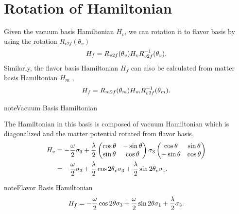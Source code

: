 \documentclass[letterpaper,12pt,english]{sphinxmanual}
\begin{document}
\section{Rotation of Hamiltonian}
\label{basis:rotation-of-hamiltonian}
Given the vacuum basis Hamiltonian \(H_v\), we can rotation it to flavor basis by using the rotation \(R_{v2f}(\theta_v)\)
\begin{gather}
\begin{split}H_f = R_{v2f}(\theta_v) H_v R_{v2f}^{-1}(\theta_v).\end{split}\notag
\end{gather}
Similarly, the flavor basis Hamiltonian \(H_f\) can also be calculated from matter basis Hamiltonian \(H_m\) ,
\begin{gather}
\begin{split}H_f = R_{m2f}(\theta_m) H_m R_{v2f}^{-1}(\theta_m).\end{split}\notag
\end{gather}
\begin{notice}{note}{Vacuum Basis Hamiltonian}

The Hamiltonian in this basis is composed of vacuum Hamiltonian which is diagonalized and the matter potential rotated from flavor basis,
\begin{gather}
\begin{split}H_v &= -\frac{\omega}{2} \sigma_3 + \frac{\lambda}{2} \begin{pmatrix} \cos \theta & -\sin \theta \\ \sin \theta & \cos\theta \end{pmatrix}  \sigma_3 \begin{pmatrix} \cos \theta & \sin \theta \\ -\sin \theta & \cos\theta \end{pmatrix} \\
&= -\frac{\omega}{2} \sigma_3 + \frac{\lambda}{2}\cos 2\theta_v \sigma_3 + \frac{\lambda}{2} \sin 2\theta_v \sigma_1.\end{split}\notag
\end{gather}\end{notice}

\begin{notice}{note}{Flavor Basis Hamiltonian}
\begin{gather}
\begin{split}H_f = - \frac{\omega}{2} \cos 2\theta \sigma_3 +  \frac{\omega}{2} \sin 2\theta \sigma_1 +  \frac{\lambda}{2} \sigma_3.\end{split}\notag
\end{gather}\end{notice}
\end{document}
